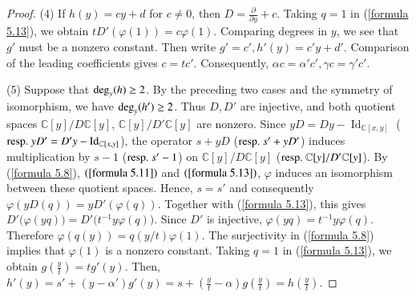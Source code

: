 \documentclass[12pt,reqno]{amsart}
\def\deg{{\rm deg}}
\def\C{\mathbb{C}}
\numberwithin{equation}{section}
\begin{document}
\begin{proof}
\rm(4) If $h(y)=cy+d$ for $c\ne0$, then $D=\frac{\partial}{\partial{y}}+c$. Taking $q=1$ in (\ref{formula 5.13}), we obtain $tD'(\varphi(1))=c\varphi(1)$. 
Comparing degrees in $y$, we see that $g'$ must be a nonzero constant. Then write $g'=c', h'(y)=c'y+d'$.  
Comparison of the leading coefficients gives $c=tc'$. 
Consequently, $\alpha c=\alpha'c',\gamma c=\gamma'c'$.


\rm(5)  Suppose that $\deg_y (h)\ge2$. By the preceding two cases and the symmetry of isomorphism, we have $\deg_y (h')\ge2$. Thus $D,D'$ are injective, and both quotient spaces $\mathbb C[y]/D\mathbb C[y]$,  $\mathbb C[y]/D'\mathbb C[y]$ are nonzero. Since $yD=Dy-\operatorname{Id}_{\C[x,y]}$ (${\rm resp.}\ yD'=D'y-\operatorname{Id}_{\C[x,y]}$), the operator $s+yD$ (${\rm resp.}\ s'+yD'$) induces multiplication by $s-1$ (${\rm resp.}\ s'-1$) on $\mathbb C[y]/D\mathbb C[y]$ (${\rm resp.}\ \mathbb C[y]/D'\mathbb C[y]$). By (\ref{formula 5.8}), $(\ref{formula 5.11})$ and $(\ref{formula 5.13})$, $\varphi$  induces an isomorphism between these quotient spaces. Hence, $s=s'$ and consequently 
$\varphi(yD(q))=yD'(\varphi(q))$. Together with (\ref{formula 5.13}), this gives $D'\Big(\varphi(yq)\Big)=D'\Big( t^{-1}y\varphi(q)   \Big)$.
 Since $D'$ is injective, $\varphi(yq)=t^{-1}y\varphi(q)$. Therefore  $\varphi(q(y))=q(y/t)\varphi(1)$.
The surjectivity in (\ref{formula 5.8}) implies that $\varphi(1)$ is a nonzero constant. 
Taking $q=1$ in (\ref{formula 5.13}),
we obtain
$g\left(\frac{y}{t}\right)=tg'(y)$. Then, $h'(y)=s'+(y-\alpha')g'(y)=s+\left(\frac{y}{t}-\alpha\right)g\left(\frac{y}{t}\right)=h\left(\frac{y}{t}\right)$.


\end{proof}
\end{document}
